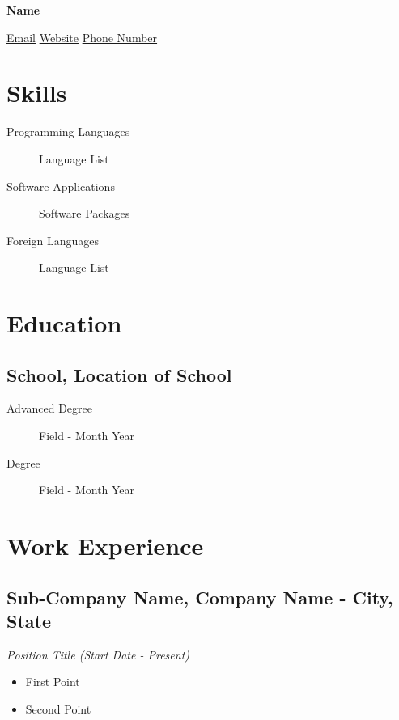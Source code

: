 \documentclass[10pt,letterpaper]{article}
\begin{document}
\centerline{\Large\bfseries Name}

\vspace{0.5em}

\centerline{\href{mailto: Email}{Email} {\large\textperiodcentered} \href{Website}{Website} {\large\textperiodcentered} \href{tel:Phone Number}{Phone Number} \ {\Large}}


\section{Skills}\label{skills}

\begin{description}
\item[Programming Languages]
Language List
\item[Software Applications]
Software Packages
\item[Foreign Languages]
Language List
\end{description}

\section{Education}\label{education}

\subsection{School, Location of School}\label{school-location-of-school}

\begin{description}
\item[Advanced Degree]
Field - Month Year
\item[Degree]
Field - Month Year
\end{description}

\section{Work Experience}\label{work-experience}

\subsection{Sub-Company Name, Company Name - City,
State}\label{sub-company-name-company-name---city-state}

\emph{Position Title (Start Date - Present)}

\begin{itemize}
\item
  First Point
\item
  Second Point
\end{itemize}
\end{document}
